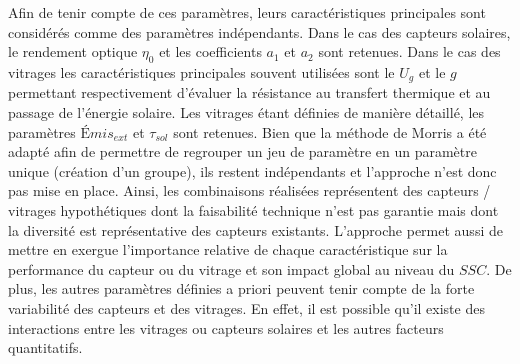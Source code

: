 Afin de tenir compte de ces paramètres, leurs caractéristiques principales sont considérés
comme des paramètres indépendants. Dans le cas des capteurs solaires, le rendement optique
$\eta_{0}$ et les coefficients $a_{1}$ et $a_{2}$ sont retenues. Dans le cas des vitrages
les caractéristiques principales souvent utilisées sont le $U_{g}$ et le $g$ permettant
respectivement d’évaluer la résistance au transfert thermique et au passage de l’énergie
solaire. Les vitrages étant définies de manière détaillé, les paramètres $Émis_{ext}$
et $\tau_{sol}$ sont retenues. Bien que la méthode de Morris a été adapté afin de permettre de
regrouper un jeu de paramètre en un paramètre unique (création d’un groupe), ils restent
indépendants et l’approche n’est donc pas mise en place. Ainsi, les combinaisons réalisées
représentent des capteurs / vitrages hypothétiques dont la faisabilité technique n’est pas
garantie mais dont la diversité est représentative des capteurs existants. L’approche permet
aussi de mettre en exergue l’importance relative de chaque
caractéristique sur la performance du capteur ou du vitrage et son impact global au niveau
du $SSC$. De plus, les autres paramètres définies a priori peuvent tenir compte de la
forte variabilité des capteurs et des vitrages. En effet, il est possible qu’il existe des
interactions entre les vitrages ou capteurs solaires et les autres facteurs quantitatifs.

